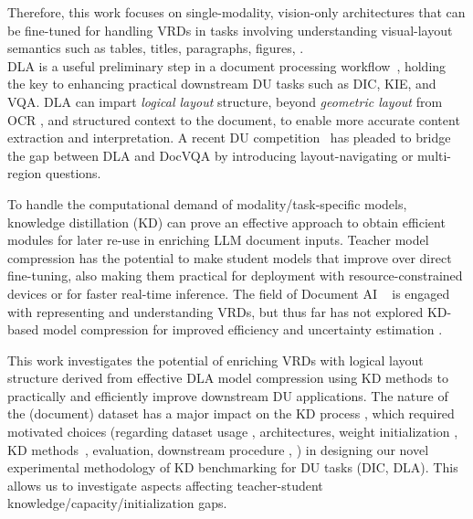 \documentclass[runningheads]{llncs}
\begin{document}
Therefore, this work focuses on single-modality, vision-only architectures that can be fine-tuned for handling VRDs in tasks involving understanding visual-layout semantics such as tables, titles, paragraphs, figures, \etc. \\
DLA is a useful preliminary step in a document processing workflow~\cite{binmakhashen2019document, da2023vision}, holding the key to enhancing practical downstream DU tasks such as DIC, KIE, and VQA. DLA can impart \textit{logical layout} structure, beyond \textit{geometric layout} from OCR \cite{haralick1994document}, and structured context to the document, to enable more accurate content extraction and interpretation. A recent DU competition~\cite{VanLandeghem2023icdar} has pleaded to bridge the gap between DLA and DocVQA by introducing layout-navigating or multi-region questions.

To handle the computational demand of modality/task-specific models, knowledge distillation (KD) \cite{ba2014deep,hinton2015distilling,romero2014fitnets,gou2021knowledge} can prove an effective approach to obtain efficient modules for later re-use in enriching LLM document inputs. Teacher model compression has the potential to make student models that improve over direct fine-tuning, also making them practical for deployment with resource-constrained devices or for faster real-time inference.
The field of Document AI ~\cite{cui2021document} is engaged with representing and understanding VRDs, but thus far has not explored KD-based model compression for improved efficiency and uncertainty estimation \cite{galil2023can}.

This work investigates the potential of enriching VRDs with logical layout structure derived from effective DLA model compression using KD methods to practically and efficiently improve downstream DU applications.
The nature of the (document) dataset has a major impact on the KD process \cite{stanton2021does}, which required motivated choices (regarding dataset usage \cite{pfitzmann2022doclaynet,
    antonacopoulos2009realistic,
    harley2015evaluation}, architectures, weight initialization \cite{li2022dit}, KD methods~\cite{SimKD, he2021distilling, chen2021distilling, zhang2020distilling, hsieh2023distilling,hinton2015distilling}, evaluation, downstream procedure \cite{wang2023layout}, \etc) in designing our novel experimental methodology of KD benchmarking for DU tasks (DIC, DLA). This allows us to investigate aspects affecting teacher-student knowledge/capacity/initialization gaps.
\end{document}
